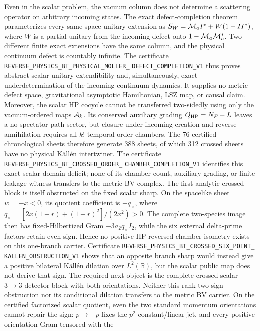 \documentclass[11pt]{article}
\theoremstyle{definition}
\theoremstyle{remark}
\begin{document}
Even in the scalar problem, the vacuum column does not determine a scattering
operator on arbitrary incoming states.  The exact defect-completion theorem
parameterizes every same-space unitary extension as
$S_W={\cal M}_aI^*+W(1-II^*)$, where $W$ is a partial unitary from the incoming
defect onto $1-{\cal M}_a{\cal M}_a^*$.  Two different finite exact
extensions have the same column, and the physical continuum defect is
countably infinite.  The certificate
\texttt{REVERSE\_PHYSICS\_BT\_PHYSICAL\_MOLLER\_}
\allowbreak\texttt{DEFECT\_COMPLETION\_V1}
thus proves abstract scalar unitary extendibility and, simultaneously, exact
underdetermination of the incoming-continuum dynamics.  It supplies no metric
defect space, gravitational asymptotic Hamiltonian, LSZ map, or causal claim.
Moreover, the scalar HP cocycle cannot be transferred two-sidedly using only
the vacuum-ordered maps ${\cal A}_k$.  Its conserved auxiliary grading
$Q_{\rm HP}=N_F-L$ leaves a no-spectator path sector, but closure under
incoming creation and reverse annihilation requires all $k!$ temporal
order chambers.  The 76 certified chronological sheets therefore generate
388 sheets, of which 312 crossed sheets have no physical Källén intertwiner.
The certificate
\texttt{REVERSE\_PHYSICS\_BT\_CROSSED\_ORDER\_}
\allowbreak\texttt{CHAMBER\_COMPLETION\_V1}
identifies this exact scalar domain deficit; none of its chamber count,
auxiliary grading, or finite leakage witness transfers to the metric BV
complex.
The first analytic crossed block is itself obstructed on the fixed scalar
sharp.  On the spacelike sheet $w=-x<0$, its quotient coefficient is
$-q_\times$, where
$q_\times=[2x(1+r)+(1-r)^2]/(2x^2)>0$.  The complete two-species image then
has fixed-Hilbertized Gram $-3a_2q_\times I_2$, while the six external
delta-prime factors retain even sign.  Hence no positive HP reversed-chamber
isometry exists on this one-branch carrier.  Certificate
\texttt{REVERSE\_PHYSICS\_BT\_CROSSED\_SIX\_POINT\_}
\allowbreak\texttt{KALLEN\_OBSTRUCTION\_V1}
shows that an opposite branch sharp would instead give a positive bilateral
Källén dilation over $L^2(\mathbb R)$, but the scalar public map does not
derive that sign.  The required next object is the complete crossed scalar
$3\to3$ detector block with both orientations.  Neither this rank-two sign
obstruction nor its conditional dilation transfers to the metric BV
carrier.
On the certified factorized scalar quotient, even the two standard momentum
orientations cannot repair the sign: $p\mapsto-p$ fixes the $p^2$
constant/linear jet, and every positive orientation Gram tensored with the
\end{document}
